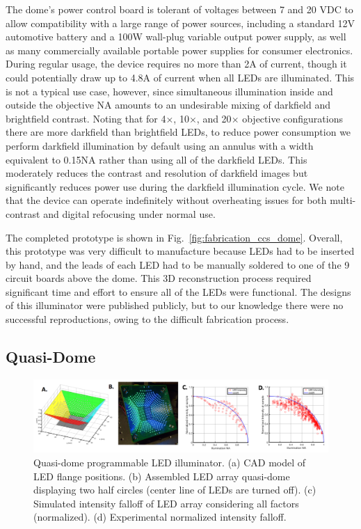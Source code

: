 The dome's power control board is tolerant of voltages between 7 and 20 VDC to allow compatibility with a large range of power sources, including a standard 12V automotive battery and a 100W wall-plug variable output power supply, as well as many commercially available portable power supplies for consumer electronics. During regular usage, the device requires no more than 2A of current, though it could potentially draw up to 4.8A of current when all LEDs are illuminated. This is not a typical use case, however, since simultaneous illumination inside and outside the objective NA amounts to an undesirable mixing of darkfield and brightfield contrast. Noting that for 4$\times$, 10$\times$, and 20$\times$ objective configurations there are more darkfield than brightfield LEDs, to reduce power consumption we perform darkfield illumination by default using an annulus with a width equivalent to 0.15NA rather than using all of the darkfield LEDs. This moderately reduces the contrast and resolution of darkfield images but significantly reduces power use during the darkfield illumination cycle. We note that the device can operate indefinitely without overheating issues for both multi-contrast and digital refocusing under normal use.

The completed prototype is shown in Fig.~\ref{fig:fabrication_ccs_dome}. Overall, this prototype was very difficult to manufacture because LEDs had to be inserted by hand, and the leads of each LED had to be manually soldered to one of the 9 circuit boards above the dome. This 3D reconstruction process required significant time and effort to ensure all of the LEDs were functional. The designs of this illuminator were published publicly, but to our knowledge there were no successful reproductions, owing to the difficult fabrication process.

\subsection{Quasi-Dome}\label{sec:fabrication:quasidome}

\begin{figure}
    \centering
    \includegraphics[width=\textwidth]{figures/fig_qdome_main.png}
    \caption{Quasi-dome programmable LED illuminator. (a) CAD model of LED flange positions. (b) Assembled LED array quasi-dome displaying two half circles (center line of LEDs are turned off). (c) Simulated intensity falloff of LED array considering all factors (normalized). (d) Experimental normalized intensity falloff.}\label{fig:fabrication:fig_fabrication_quasi_dome}
\end{figure}

